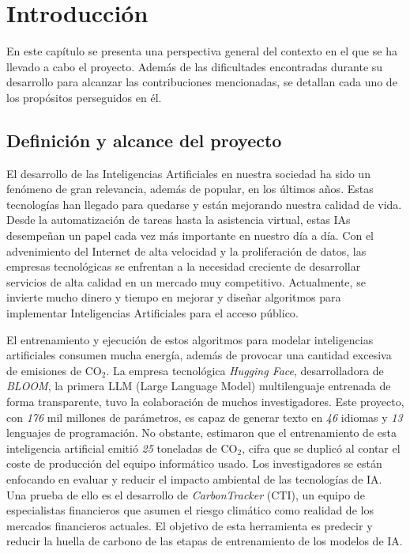 \chapter{Introducción}

En este capítulo se presenta una perspectiva general del contexto en el que se ha llevado a cabo el proyecto. Además de las dificultades encontradas durante su desarrollo para alcanzar las contribuciones mencionadas, se detallan cada uno de los propósitos perseguidos en él.


\section{Definición y alcance del proyecto}

	El desarrollo de las Inteligencias Artificiales en nuestra sociedad ha sido un fenómeno de gran relevancia, además de popular, en los últimos años. Estas tecnologías han llegado para quedarse y están mejorando nuestra calidad de vida. Desde la automatización de tareas hasta la asistencia virtual\cite{lugano2017virtual}, estas IAs desempeñan un papel cada vez más importante en nuestro día a día.
	Con el advenimiento del Internet de alta velocidad y la proliferación de datos, las empresas tecnológicas se enfrentan a la necesidad creciente de desarrollar servicios de alta calidad en un mercado muy competitivo. Actualmente, se invierte mucho dinero y tiempo en mejorar y diseñar algoritmos para implementar Inteligencias Artificiales para el acceso público\cite{thomas2021global}.
	
	El entrenamiento y ejecución de estos algoritmos para modelar inteligencias artificiales consumen mucha energía, además de provocar una cantidad excesiva de emisiones de CO\(_2\). La empresa tecnológica \textit{Hugging Face}, desarrolladora de \textit{BLOOM}\cite{BloomAI}, la primera LLM (Large Language Model) multilenguaje entrenada de forma transparente, tuvo la colaboración de muchos investigadores. Este proyecto, con \textit{176} mil millones de parámetros, es capaz de generar texto en \textit{46} idiomas y \textit{13} lenguajes de programación. No obstante, estimaron que el entrenamiento de esta inteligencia artificial emitió \textit{25} toneladas de CO\(_2\), cifra que se duplicó al contar el coste de producción del equipo informático usado\cite{kirkpatrick2023carbon}. Los investigadores se están enfocando en evaluar y reducir el impacto ambiental de las tecnologías de IA. Una prueba de ello es el desarrollo de \textit{CarbonTracker}\cite{jeppesen2021carbon} (CTI), un equipo de especialistas financieros que asumen el riesgo climático como realidad de los mercados financieros actuales. El objetivo de esta herramienta es predecir y reducir la huella de carbono de las etapas de entrenamiento de los modelos de IA\cite{mor2021artificial}.
	
